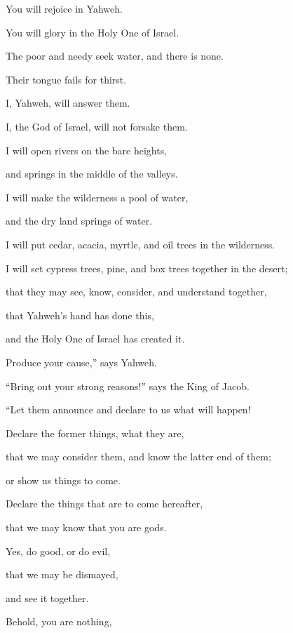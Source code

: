 {\par }{\Q You will rejoice in Yahweh.
\par }{\QB You will glory in the Holy One of Israel.
\par }{\BB \par }{\Q {}The poor and needy seek water, and there is none.
\par }{\QB Their tongue fails for thirst.
\par }{\Q I, Yahweh, will answer them.
\par }{\QB I, the God of Israel, will not forsake them.
\par }{\Q {}I will open rivers on the bare heights,
\par }{\QB and springs in the middle of the valleys.
\par }{\QB I will make the wilderness a pool of water,
\par }{\QB and the dry land springs of water.
\par }{\Q {}I will put cedar, acacia, myrtle, and oil trees in the wilderness.
\par }{\QB I will set cypress trees, pine, and box trees together in the desert;
\par }{\QB {}that they may see, know, consider, and understand together,
\par }{\QB that Yahweh’s hand has done this,
\par }{\QB and the Holy One of Israel has created it.
\par }{\BB \par }{\Q {}Produce your cause,” says Yahweh.
\par }{\QB “Bring out your strong reasons!” says the King of Jacob.
\par }{\Q {}“Let them announce and declare to us what will happen!
\par }{\QB Declare the former things, what they are,
\par }{\QB that we may consider them, and know the latter end of them;
\par }{\QB or show us things to come.
\par }{\Q {}Declare the things that are to come hereafter,
\par }{\QB that we may know that you are gods.
\par }{\Q Yes, do good, or do evil,
\par }{\QB that we may be dismayed,
\par }{\QB and see it together.
\par }{\Q {}Behold, you are nothing,
}
